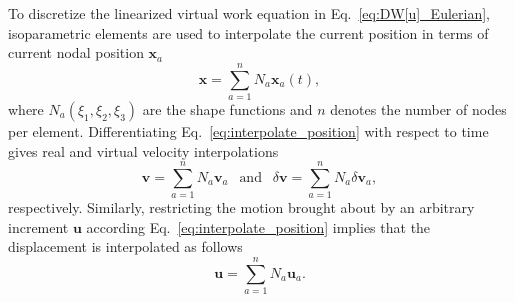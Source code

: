 To discretize the linearized virtual work equation in Eq.\ \eqref{eq:DW[u]_Eulerian}, isoparametric elements are used to interpolate the current position in terms of current nodal position $\pmb{x}_a$
%
\begin{equation}
\pmb{x} = \sum_{a=1}^n N_a \pmb{x}_a(t),
\label{eq:interpolate_position}
\end{equation}
% 
where $N_a(\xi_1,\xi_2,\xi_3)$ are the shape functions and $n$ denotes the number of nodes per element. Differentiating Eq.\ \eqref{eq:interpolate_position} with respect to time gives real and virtual velocity interpolations
%
\begin{equation}
\pmb{v} = \sum_{a=1}^n N_a \pmb{v}_a \ \ \text{ and } \ \ \delta \pmb{v} = \sum_{a=1}^n N_a \delta \pmb{v}_a,
\label{eq:interpolate_velocity}
\end{equation}
%
respectively.  Similarly, restricting the motion brought about by an arbitrary increment $\pmb{u}$ according Eq.\ \eqref{eq:interpolate_position} implies that the displacement is interpolated as follows
%
\begin{equation}
\pmb{u} = \sum_{a=1}^n N_a \pmb{u}_a.
\label{eq:interpolate_displacement}
\end{equation}
%

